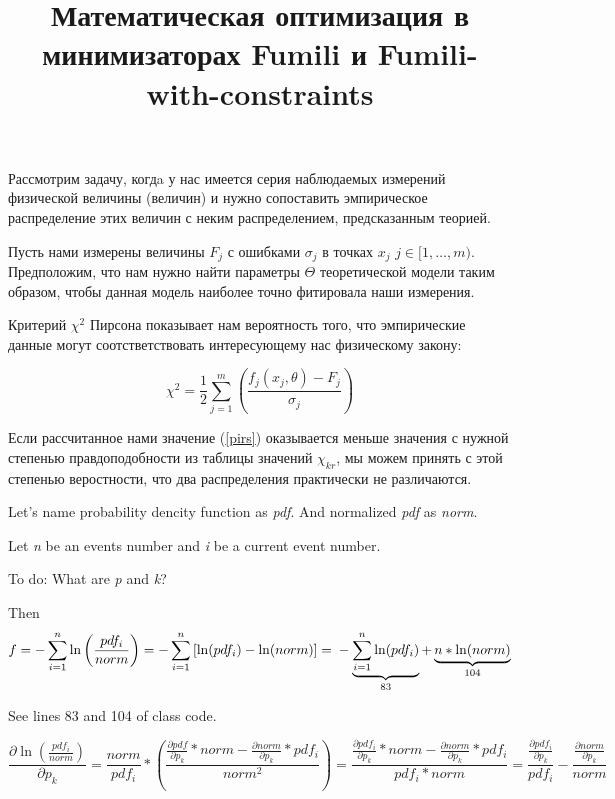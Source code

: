 \documentclass[a4paper,10pt]{article}
\title{Математическая оптимизация в минимизаторах Fumili и Fumili-with-constraints}
\begin{document}
\maketitle

Рассмотрим задачу, когдa у нас имеется серия наблюдаемых измерений физической величины (величин) и нужно сопоставить эмпирическое распределение этих величин с неким распределением, предсказанным теорией.

Пусть нами измерены величины $F_j$ с ошибками $\sigma_j$ в точках $x_j$ $j \in [1, \dots, m)$.
Предположим, что нам нужно найти параметры $\Theta$ теоретической модели таким образом, чтобы данная модель наиболее точно фитировала наши измерения.

Критерий $\chi^2$ Пирсона показывает нам вероятность того, что эмпирические данные могут соотстветствовать интересующему нас физическому закону:

\begin{equation}
\label{pirs}
 \chi^2 = \frac{1}{2} \sum_{j = 1}^{m} \left( \frac{f_j(x_j,\theta) - F_j}{\sigma_j} \right)
\end{equation}

Если рассчитанное нами значение (\ref{pirs}) оказывается меньше значения с нужной степенью правдоподобности из таблицы значений $\chi_{kr}$, мы можем принять с этой степенью веростности, что два распределения практически не различаются.

Let's name probability dencity function as \textit{pdf}. And normalized \textit{pdf} as \textit{norm}.

Let \textit{n} be an events number and \textit{i} be a current event number.

To do: What are \textit{p} and \textit{k}?

Then
$$f = - \sum_{i=1}^{n}\ln \left(\frac{pdf_i}{norm} \right) = - \sum_{i=1}^{n} \left[\ln(pdf_i) - \ln(norm) \right] =\\
- \underbrace{\sum_{i=1}^{n} \ln(pdf_i)}_{83} + \underbrace{n*\ln(norm)}_{104} $$

See lines 83 and 104 of class code.

$$\frac{\partial \ln \left( \frac{pdf_i}{norm}\right)}{\partial p_k}  = \frac{norm}{pdf_i}* \left(\frac{\frac{\partial pdf}{\partial p_k}*norm - \frac{\partial norm}{\partial p_k}*pdf_i}{norm^2} \right) = \frac{\frac{\partial pdf_i}{\partial p_k}*norm - \frac{\partial norm}{\partial p_k}*pdf_i}{pdf_i*norm} = \frac{\frac{\partial pdf_i}{\partial p_k}}{pdf_i} - \frac{\frac{\partial norm}{\partial p_k}}{norm}$$
\end{document}
